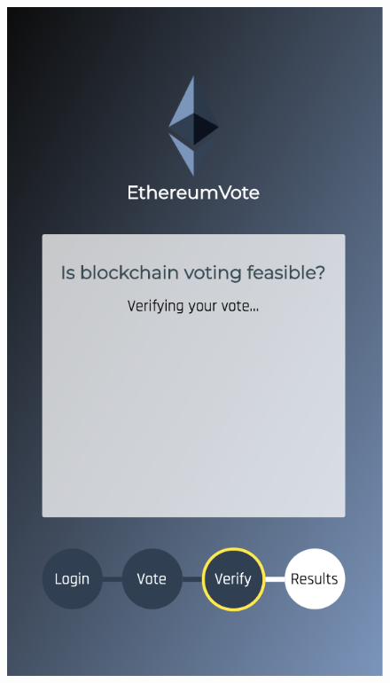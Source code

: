 	\begin{figure}
		\centering
		\includegraphics[width=\linewidth/3]{img/screen_verify.png}

\end{figure}
